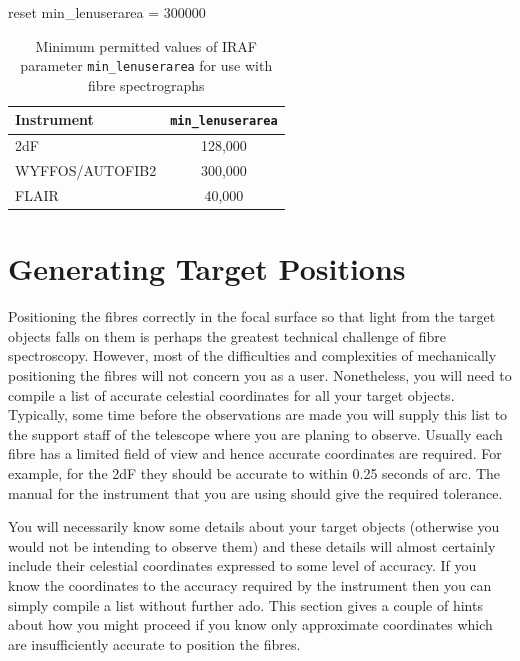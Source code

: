 \documentclass[twoside,11pt]{starlink}
\begin{document}
\begin{terminalv}
reset min_lenuserarea  =  300000
\end{terminalv}

\begin{table}[htbp]

\begin{center}
\begin{tabular}{lc}
Instrument      & \texttt{min\_lenuserarea} \\ \hline
2dF             & 128,000 \\
WYFFOS/AUTOFIB2 & 300,000 \\
FLAIR           &  40,000 \\
\end{tabular}
\end{center}

\caption[Values of IRAF parameter \texttt{min\_lenuserarea} for fibre
spectrographs]{Minimum permitted values of IRAF parameter \texttt{min\_lenuserarea} for use with fibre spectrographs
\label{MINLENUSERAREA} }

\end{table}


\section{\label{TARGET}Generating Target Positions}

Positioning the fibres correctly in the focal surface so that light
from the target objects falls on them is perhaps the greatest technical
challenge of fibre spectroscopy.  However, most of the difficulties and
complexities of mechanically positioning the fibres will not concern
you as a user.  Nonetheless, you will need to compile a list of accurate
celestial coordinates for all your target objects.  Typically, some
time before the observations are made you will supply this list to
the support staff of the telescope where you are planing to observe.
Usually each fibre has a limited field of view and hence accurate
coordinates are required.  For example, for the 2dF they should be
accurate to within 0.25 seconds of arc.  The manual for the instrument
that you are using should give the required tolerance.

You will necessarily know some details about your target objects
(otherwise you would not be intending to observe them) and these details
will almost certainly include their celestial coordinates expressed to
some level of accuracy.  If you know the coordinates to the accuracy
required by the instrument then you can simply compile a list without
further ado.  This section gives a couple of hints about how you might
proceed if you know only approximate coordinates which are
insufficiently accurate to position the fibres.
\end{document}

